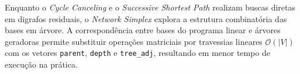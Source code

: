 Enquanto o \textit{Cycle Canceling} e o \textit{Successive Shortest Path} realizam buscas diretas em digrafos residuais, o \textit{Network Simplex} explora a estrutura combinatória das bases em árvore. A correspondência entre bases do programa linear e árvores geradoras permite substituir operações matriciais por travessias lineares $\mathcal{O}(|V|)$ com os vetores \lstinline{parent}, \lstinline{depth} e \lstinline{tree_adj}, resultando em menor tempo de execução na prática.

\vspace{0.8cm}

